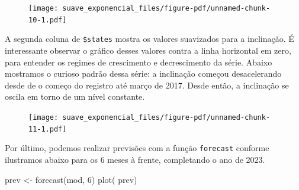 \documentclass[
  letterpaper,
  DIV=11,
  numbers=noendperiod]{scrartcl}
\newenvironment{Shaded}{\begin{snugshade}}{\end{snugshade}}
\newcommand{\AttributeTok}[1]{\textcolor[rgb]{0.40,0.45,0.13}{#1}}
\newcommand{\DecValTok}[1]{\textcolor[rgb]{0.68,0.00,0.00}{#1}}
\newcommand{\FunctionTok}[1]{\textcolor[rgb]{0.28,0.35,0.67}{#1}}
\newcommand{\NormalTok}[1]{\textcolor[rgb]{0.00,0.23,0.31}{#1}}
\newcommand{\OtherTok}[1]{\textcolor[rgb]{0.00,0.23,0.31}{#1}}
\newcommand{\SpecialCharTok}[1]{\textcolor[rgb]{0.37,0.37,0.37}{#1}}
\newcommand{\StringTok}[1]{\textcolor[rgb]{0.13,0.47,0.30}{#1}}
\theoremstyle{plain}
\theoremstyle{plain}
\theoremstyle{definition}
\theoremstyle{definition}
\theoremstyle{remark}
\begin{document}
\begin{figure}[H]

{\centering \texttt{[image: suave\_exponencial\_files/figure-pdf/unnamed-chunk-10-1.pdf]}

}

\end{figure}

A segunda coluna de \texttt{\$states} mostra os valores suavizados para
a inclinação. É interessante observar o gráfico desses valores contra a
linha horizontal em zero, para entender os regimes de crescimento e
decrescimento da série. Abaixo mostramos o curioso padrão dessa série: a
inclinação começou desacelerando desde de o começo do registro até março
de 2017. Desde então, a inclinação se oscila em torno de um nível
constante.

\begin{Shaded}
\end{Shaded}

\begin{figure}[H]

{\centering \texttt{[image: suave\_exponencial\_files/figure-pdf/unnamed-chunk-11-1.pdf]}

}

\end{figure}

Por último, podemos realizar previsões com a função \texttt{forecast}
conforme ilustramos abaixo para os 6 meses à frente, completando o ano
de 2023.

\begin{Shaded}
\begin{Highlighting}[]
\NormalTok{prev }\OtherTok{\textless{}{-}} \FunctionTok{forecast}\NormalTok{(mod, }\DecValTok{6}\NormalTok{)}
\FunctionTok{plot}\NormalTok{( prev)}
\end{Highlighting}
\end{Shaded}
\end{document}
